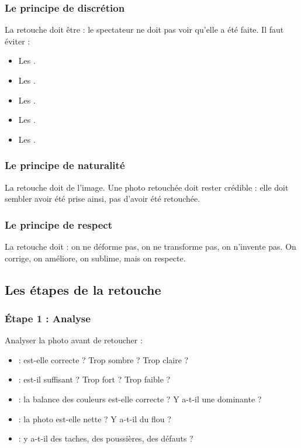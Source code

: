 \subsubsection{Le principe de discrétion}

La retouche doit être  : le spectateur ne doit pas voir qu'elle a été faite. Il faut éviter :

\begin{itemize}
    \item Les .
    \item Les .
    \item Les .
    \item Les .
    \item Les .
\end{itemize}

\subsubsection{Le principe de naturalité}

La retouche doit  de l'image. Une photo retouchée doit rester crédible : elle doit sembler avoir été prise ainsi, pas d'avoir été retouchée.

\subsubsection{Le principe de respect}

La retouche doit  : on ne déforme pas, on ne transforme pas, on n'invente pas. On corrige, on améliore, on sublime, mais on respecte.

\subsection{Les étapes de la retouche}

\subsubsection{Étape 1 : Analyse}

Analyser la photo avant de retoucher :

\begin{itemize}
    \item {} : est-elle correcte ? Trop sombre ? Trop claire ?
    \item {} : est-il suffisant ? Trop fort ? Trop faible ?
    \item {} : la balance des couleurs est-elle correcte ? Y a-t-il une dominante ?
    \item {} : la photo est-elle nette ? Y a-t-il du flou ?
    \item {} : y a-t-il des taches, des poussières, des défauts ?
\end{itemize}

